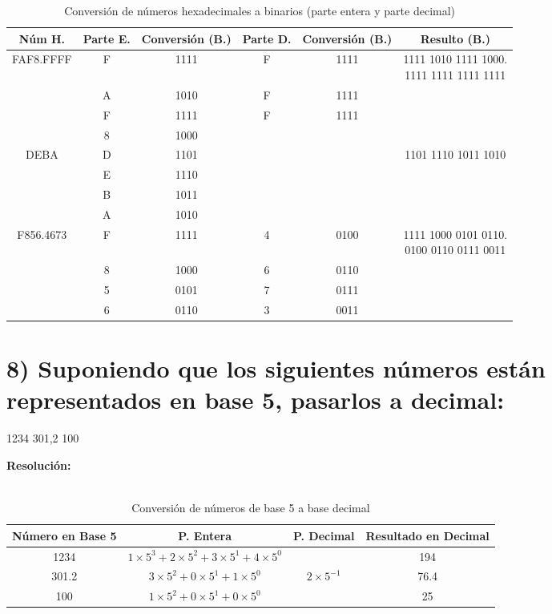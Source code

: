 \documentclass[12pt]{article}
\begin{document}
\begin{table}[H]
	\centering
	\renewcommand{\arraystretch}{1.3}
	\begin{tabular}{|c|c|c|c|c|c|}
		\hline
		\textbf{Núm H.} & \textbf{Parte E.} & \textbf{Conversión (B.)} & \textbf{Parte D.} & \textbf{Conversión (B.)} & \textbf{Resulto (B.)} \\
		\hline
		FAF8.FFFF & F & 1111 & F & 1111 & \makecell[l]{1111 1010 1111 1000.\\1111 1111 1111 1111} \\
		\hline
		& A & 1010 & F & 1111 & \\
		\hline
		& F & 1111 & F & 1111 & \\
		\hline
		& 8 & 1000 &  &  & \\
		\hline
		DEBA & D & 1101 &  &  & 1101 1110 1011 1010 \\
		\hline
		& E & 1110 &  &  & \\
		\hline
		& B & 1011 &  &  & \\
		\hline
		& A & 1010 &  &  & \\
		\hline
		F856.4673 & F & 1111 & 4 & 0100 & \makecell[l]{1111 1000 0101 0110.\\0100 0110 0111 0011} \\
		\hline
		& 8 & 1000 & 6 & 0110 & \\
		\hline
		& 5 & 0101 & 7 & 0111 & \\
		\hline
		& 6 & 0110 & 3 & 0011 & \\
		\hline
	\end{tabular}
	\caption{Conversión de números hexadecimales a binarios (parte entera y parte decimal)}
\end{table}

\section*{8) Suponiendo que los siguientes números están representados en base 5, pasarlos a decimal:}

\begin{center}
1234 \hspace{1cm} 301{,}2 \hspace{1cm} 100
\end{center}


\textbf{Resolución:} \\\\


\begin{table}[H]
	\centering
	\renewcommand{\arraystretch}{1.3}
	\begin{tabular}{|c|c|c|c|}
		\hline
		\textbf{Número en Base 5} & \textbf{P. Entera} & \textbf{P. Decimal} & \textbf{Resultado en Decimal} \\
		\hline
		1234 & $1 \times 5^3 + 2 \times 5^2 + 3 \times 5^1 + 4 \times 5^0$ &  & 194 \\
		\hline
		301.2 & $3 \times 5^2 + 0 \times 5^1 + 1 \times 5^0$ & $2 \times 5^{-1}$ & 76.4 \\
		\hline
		100 & $1 \times 5^2 + 0 \times 5^1 + 0 \times 5^0$ &  & 25 \\
		\hline
	\end{tabular}
	\caption{Conversión de números de base 5 a base decimal}
\end{table}
\end{document}
